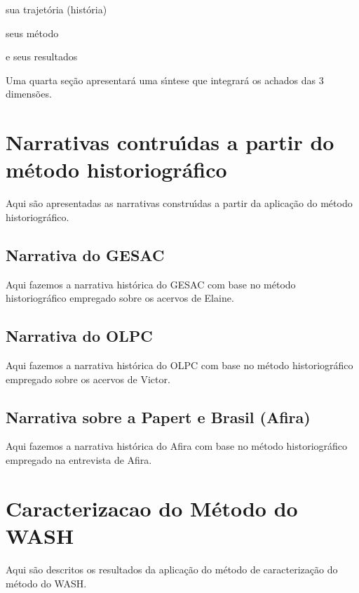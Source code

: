 \documentclass[
12pt,		%
openright,	%
twoside,  %
a4paper,			%
chapter=TITLE,		%
english,			%
french,				%
spanish,			%
brazil				%
]{USPSC-classe/USPSC}
\begin{document}
\begin{alineas}
\item sua trajet\'oria (hist\'oria)
\item seus m\'etodo
\item e seus resultados
\end{alineas}

Uma quarta se\c{c}\~ao apresentar\'a uma s\'{\i}ntese que integrar\'a os achados das 3 dimens\~oes.


\section[Narrativas contru\'{\i}das a partir do m\'etodo historiogr\'afico]{Narrativas contru\'{\i}das a partir do m\'etodo historiogr\'afico}\label{Narrativas contru\'{\i}das a partir do m\'etodo historiogr\'afico}
Aqui s\~ao apresentadas as narrativas constru\'{\i}das a partir da aplica\c{c}\~ao do m\'etodo historiogr\'afico.


\subsection[Narrativa do GESAC]{Narrativa do GESAC}\label{Narrativa do GESAC}
Aqui fazemos a narrativa hist\'orica do GESAC com base no m\'etodo historiogr\'afico empregado sobre os acervos de Elaine.


\subsection[Narrativa do OLPC]{Narrativa do OLPC}\label{Narrativa do OLPC}
Aqui fazemos a narrativa hist\'orica do OLPC com base no m\'etodo historiogr\'afico empregado sobre os acervos de Victor.


\subsection[Narrativa sobre a Papert e Brasil (Afira)]{Narrativa sobre a Papert e Brasil (Afira)}\label{Narrativa sobre a Papert e Brasil (Afira)}
Aqui fazemos a narrativa hist\'orica do Afira com base no m\'etodo historiogr\'afico empregado na entrevista de Afira.


\section[Caracterizacao do M\'etodo do WASH]{Caracterizacao do M\'etodo do WASH}\label{Caracterizacao do M\'etodo do WASH}
Aqui s\~ao descritos os resultados da aplica\c{c}\~ao do m\'etodo de caracteriza\c{c}\~ao do m\'etodo do WASH.
\end{document}
